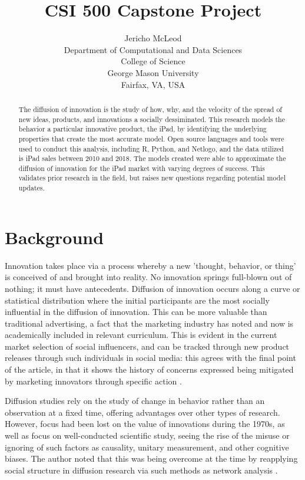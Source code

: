 \documentclass[11pt]{article}
\title{CSI 500 Capstone Project}
\author{Jericho McLeod
		\\Department of Computational and Data Sciences
		\\College of Science
		\\George Mason University
		\\Fairfax, VA, USA}
\begin{document}
\maketitle

\begin{abstract}
	
The diffusion of innovation is the study of how, why, and the velocity of the spread of new ideas, products, and innovations a socially dessiminated. This research models the behavior a particular innovative product, the iPad, by identifying the underlying properties that create the most accurate model. Open source languages and tools were used to conduct this analysis, including R, Python, and Netlogo, and the data utilized is iPad sales between 2010 and 2018. The models created were able to approximate the diffusion of innovation for the iPad market with varying degrees of success. This validates prior research in the field, but raises new questions regarding potential model updates.

\end{abstract}


\section{Background}

Innovation takes place via a process whereby a new 'thought, behavior, or thing' is conceived of and brought into reality. No innovation springs full-blown out of nothing; it must have antecedents. Diffusion of innovation occurs along a curve or statistical distribution where the initial participants are the most socially influential in the diffusion of innovation. This can be more valuable than traditional advertising, a fact that the marketing industry has noted and now is academically included in relevant curriculum. This is evident in the current market selection of social influencers, and can be tracked through new product releases through such individuals in social media: this agrees with the final point of the article, in that it shows the history of concerns expressed being mitigated by marketing innovators through specific action  \cite{Robertson67}.


Diffusion studies rely on the study of change in behavior rather than an observation at a fixed time, offering advantages over other types of research. However, focus had been lost on the value of innovations during the 1970s, as well as focus on well-conducted scientific study, seeing the rise of the misuse or ignoring of such factors as causality, unitary measurement, and other cognitive biases. The author noted that this was being overcome at the time by reapplying social structure in diffusion research via such methods as network analysis \cite{Rogers76}.
\end{document}
